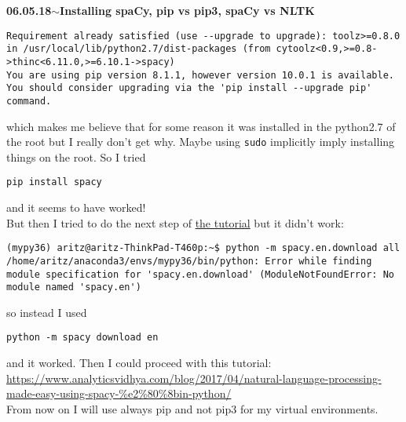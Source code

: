 \documentclass[11pt,a4paper]{article}
\newenvironment{loggentry}[2]%
{\noindent\textbf{#1}\hspace{1cm}$\mathbf{\sim}$\text{ }\textbf{#2}\\}{\vspace{0.5cm}}
\begin{document}
\begin{loggentry}{06.05.18}{Installing spaCy, pip vs pip3,  spaCy vs NLTK}
\begin{verbatim}
Requirement already satisfied (use --upgrade to upgrade): toolz>=0.8.0 in /usr/local/lib/python2.7/dist-packages (from cytoolz<0.9,>=0.8->thinc<6.11.0,>=6.10.1->spacy)
You are using pip version 8.1.1, however version 10.0.1 is available.
You should consider upgrading via the 'pip install --upgrade pip' command.
\end{verbatim}
which makes me believe that for some reason it was installed in the python2.7 of the root but I really don't get why. Maybe using \texttt{sudo} implicitly imply installing things on the root. So I tried
\begin{verbatim}
pip install spacy
\end{verbatim}
and it seems to have worked!\\
But then I tried to do the next step of \href{https://www.analyticsvidhya.com/blog/2017/04/natural-language-processing-made-easy-using-spacy-%e2%80%8bin-python/}{the tutorial} but it didn't work:
\begin{verbatim}
(mypy36) aritz@aritz-ThinkPad-T460p:~$ python -m spacy.en.download all
/home/aritz/anaconda3/envs/mypy36/bin/python: Error while finding module specification for 'spacy.en.download' (ModuleNotFoundError: No module named 'spacy.en')

\end{verbatim}
so instead I used
\begin{verbatim}
python -m spacy download en
\end{verbatim}
and it worked. Then I could proceed with this tutorial:\\
\url{https://www.analyticsvidhya.com/blog/2017/04/natural-language-processing-made-easy-using-spacy-%e2%80%8bin-python/}\\

From now on I will use always pip and not pip3 for my virtual environments.\\


\end{loggentry}
\end{document}
